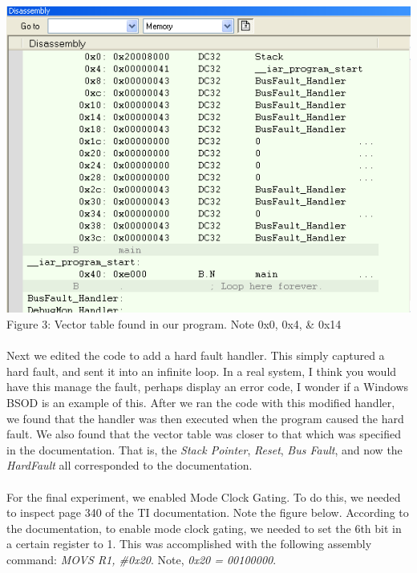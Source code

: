 \documentclass[12pt,a4paper]{report}
\begin{document}
\begin{center}
\includegraphics[scale=0.7]{img/421-diassembly.png} \\
\small{Figure 3: Vector table found in our program. Note 0x0, 0x4, \& 0x14}
\end{center}

\paragraph{}
Next we edited the code to add a hard fault handler. This simply captured a hard fault, and sent it into an infinite loop. In a real system, I think you would have this manage the fault, perhaps display an error code, I wonder if a Windows BSOD is an example of this. After we ran the code with this modified handler, we found that the handler was then executed when the program caused the hard fault. We also found that the vector table was closer to that which was specified in the documentation. That is, the \emph{Stack Pointer}, \emph{Reset}, \emph{Bus Fault}, and now the \emph{HardFault} all corresponded to the documentation. 

\paragraph{}
For the final experiment, we enabled Mode Clock Gating. To do this, we needed to inspect page 340 of the TI documentation. Note the figure below. According to the documentation, to enable mode clock gating, we needed to set the 6th bit in a certain register to 1. This was accomplished with the following assembly command: \emph{MOVS    R1, \#0x20}. Note, \emph{0x20 = 00100000}.
\end{document}
